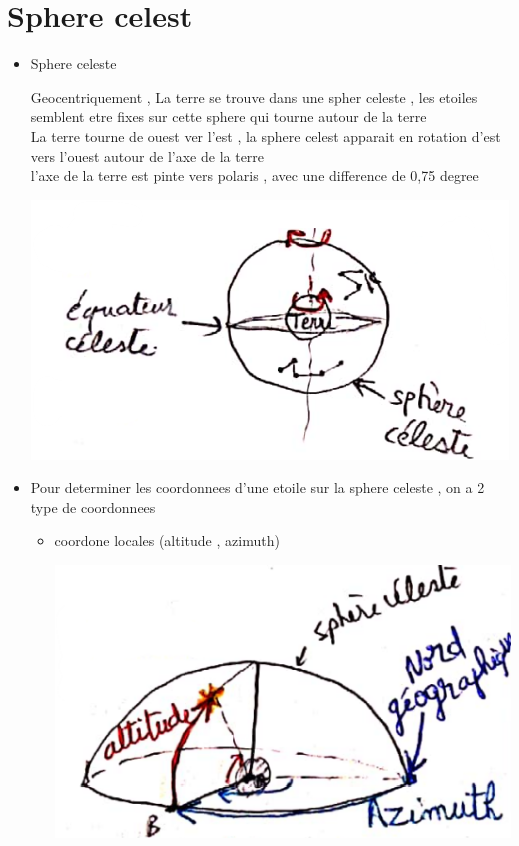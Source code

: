 \documentclass[12pt]{book}
\begin{document}
    \chapter{Sphere celest}
       \begin{itemize}
        \item  Sphere celeste\\
            \begin{minipage}{0.65\linewidth}
                Geocentriquement , La terre se trouve dans une spher celeste , les etoiles semblent etre fixes sur cette sphere qui tourne autour de la terre \\ 
                La terre tourne de ouest ver l'est , la sphere celest apparait en rotation d'est vers l'ouest autour de l'axe de la terre \\
                l'axe de la terre est pinte vers polaris , avec une difference de 0,75 degree
            \end{minipage}
            \begin{minipage}{0.34\linewidth}
                \includegraphics[width=\linewidth]{pic/spherecelest.png}
            \end{minipage}
        \item Pour determiner les coordonnees d'une etoile sur la sphere celeste , on a 2 type de coordonnees 
                \begin{itemize}
                    \item coordone locales (altitude , azimuth)\\ 
                        \begin{center}
                            \includegraphics[width=0.3\linewidth]{pic/spherecelestcoordone1.png}
                        \end{center}
                        

\end{itemize}
\end{itemize}
\end{document}
